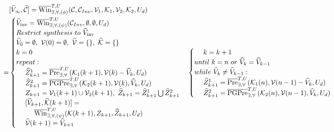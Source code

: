 {\small
\begin{align}
&[\widehat{V}_\infty, \widehat{\mathcal{C}}]=\overline{\text{Win}}_{\exists, \forall,(\phi)}^{T,U}(\mathcal{C},\mathcal{C}_{Inv},\mathcal{V}_1,\mathcal{K}_1,\mathcal{V}_2,\mathcal{K}_2,U_d)\nonumber\\
=&\begin{cases}\widehat{V}_{\text{inv}} = \overline{\text{Win}}^{T,U}_{\exists, \forall,(\psi)} (\mathcal{C}_{Inv},\emptyset,\emptyset,U_d)\\
Restrict~ synthesis~ to~ \widehat{V}_{\text{inv}}\\
\widehat{V}_0 = \emptyset,\ \mathcal{V}(0)=\emptyset,\ \widehat{\mathcal{V}}=\{\},\ \widehat{\mathcal{K}}=\{\}\\
{\color{black} k=0}\\
{\color{black} repeat:}\\
\ \ \ \ \widehat{Z}_{k+1}^1 =  \overline{\text{Pre}}_{\exists,\forall}^{T,U}(\mathcal{K}_1(k+1),\mathcal{V}(k)-\widehat{V}_k,U_d)\\
\ \ \ \ \widehat{Z}_{k+1}^2 = \overline{\text{PGPre}}_{\exists,\forall}^{T,U} ( \mathcal{K}_2(k+1),\mathcal{V}(k), \widehat{V}_k,U_d)\\
\ \ \ \ Z_{k+1}=\mathcal{V}_1(k+1)\cup\mathcal{V}_2(k+1),\  \widehat{Z}_{k+1} = \widehat{Z}_{k+1}^1\bigcup\widehat{Z}_{k+1}^2  \\
\ \ \ \ [\widehat{V}_{k+1},\widehat{\mathcal{K}}(k+1)]=\\
\ \ \ \ \ \ \ \ \overline{\text{Win}}_{\exists,\forall,(\psi)}^{T, U}(\mathcal{K}(k+1),Z_{k+1},\widehat{Z}_{k+1},U_d)\\
\ \ \ \ \widehat{\mathcal{V}}(k+1)=\widehat{V}_{k+1}\\
\end{cases}
\begin{cases}
\ \ \ \ {\color{black} k = k+1}\\
{\color{black} until \ k=n \ or \ \widehat{V}_{k}=\widehat{V}_{k-1} }\\
{\color{black} while \ \widehat{V}_{k}\not=\widehat{V}_{k-1}:}\\
\ \ \ \ \widehat{Z}_{k+1}^1 =  \overline{\text{Pre}}_{\exists,\forall}^{T,U}(\mathcal{K}_1(n),\mathcal{V}(n-1)-\widehat{V}_k,U_d)\\
\ \ \ \ \widehat{Z}_{k+1}^2 = \overline{\text{PGPre}}_{\exists,\forall}^{T,U} ( \mathcal{K}_2(n),\mathcal{V}(n-1), \widehat{V}_k,U_d)\\

\end{cases}
\end{align}}
